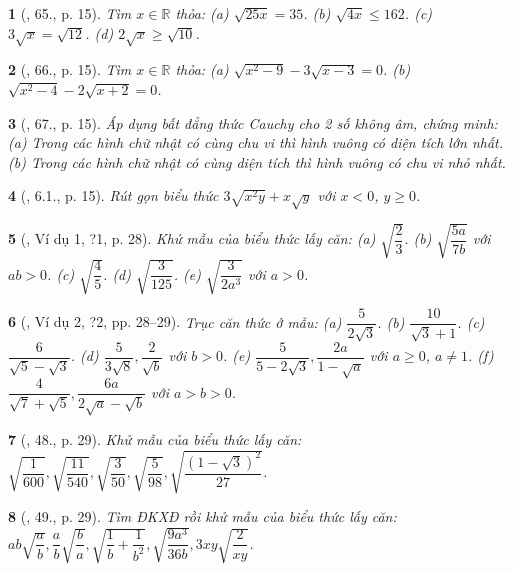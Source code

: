 \documentclass{article}
\newtheorem{baitoan}{}%
\begin{document}
\begin{baitoan}[\cite{SBT_Toan_9_tap_1}, 65., p. 15]
	Tìm $x\in\mathbb{R}$ thỏa: (a) $\sqrt{25x} = 35$. (b) $\sqrt{4x}\le162$. (c) $3\sqrt{x} = \sqrt{12}$. (d) $2\sqrt{x}\ge\sqrt{10}$.
\end{baitoan}

\begin{baitoan}[\cite{SBT_Toan_9_tap_1}, 66., p. 15]
	Tìm $x\in\mathbb{R}$ thỏa: (a) $\sqrt{x^2 - 9} - 3\sqrt{x - 3} = 0$. (b) $\sqrt{x^2 - 4} - 2\sqrt{x + 2} = 0$.
\end{baitoan}

\begin{baitoan}[\cite{SBT_Toan_9_tap_1}, 67., p. 15]
	Áp dụng bất đẳng thức Cauchy cho 2 số không âm, chứng minh: (a) Trong các hình chữ nhật có cùng chu vi thì hình vuông có diện tích lớn nhất. (b) Trong các hình chữ nhật có cùng diện tích thì hình vuông có chu vi nhỏ nhất.
\end{baitoan}

\begin{baitoan}[\cite{SBT_Toan_9_tap_1}, 6.1., p. 15]
	Rút gọn biểu thức $3\sqrt{x^2y} + x\sqrt{y}$ với $x < 0$, $y\ge0$.
\end{baitoan}

\begin{baitoan}[\cite{SGK_Toan_9_tap_1}, Ví dụ 1, ?1, p. 28]
	Khử mẫu của biểu thức lấy căn: (a) $\sqrt{\dfrac{2}{3}}$. (b) $\sqrt{\dfrac{5a}{7b}}$ với $ab > 0$. (c) $\sqrt{\dfrac{4}{5}}$. (d) $\sqrt{\dfrac{3}{125}}$. (e) $\sqrt{\dfrac{3}{2a^3}}$ với $a > 0$.
\end{baitoan}

\begin{baitoan}[\cite{SGK_Toan_9_tap_1}, Ví dụ 2, ?2, pp. 28--29]
	Trục căn thức ở mẫu: (a) $\dfrac{5}{2\sqrt{3}}$. (b) $\dfrac{10}{\sqrt{3} + 1}$. (c) $\dfrac{6}{\sqrt{5} - \sqrt{3}}$. (d) $\dfrac{5}{3\sqrt{8}},\dfrac{2}{\sqrt{b}}$ với $b > 0$. (e) $\dfrac{5}{5 - 2\sqrt{3}},\dfrac{2a}{1 - \sqrt{a}}$ với $a\ge0$, $a\ne1$. (f) $\dfrac{4}{\sqrt{7} + \sqrt{5}},\dfrac{6a}{2\sqrt{a} - \sqrt{b}}$ với $a > b > 0$.
\end{baitoan}

\begin{baitoan}[\cite{SGK_Toan_9_tap_1}, 48., p. 29]
	Khử mẫu của biểu thức lấy căn: $\sqrt{\dfrac{1}{600}},\sqrt{\dfrac{11}{540}},\sqrt{\dfrac{3}{50}},\sqrt{\dfrac{5}{98}},\sqrt{\dfrac{(1 - \sqrt{3})^2}{27}}$.
\end{baitoan}

\begin{baitoan}[\cite{SGK_Toan_9_tap_1}, 49., p. 29]
	Tìm ĐKXĐ rồi khử mẫu của biểu thức lấy căn: $ab\sqrt{\dfrac{a}{b}},\dfrac{a}{b}\sqrt{\dfrac{b}{a}},\sqrt{\dfrac{1}{b} + \dfrac{1}{b^2}},\sqrt{\dfrac{9a^3}{36b}},3xy\sqrt{\dfrac{2}{xy}}$.
\end{baitoan}
\end{document}

